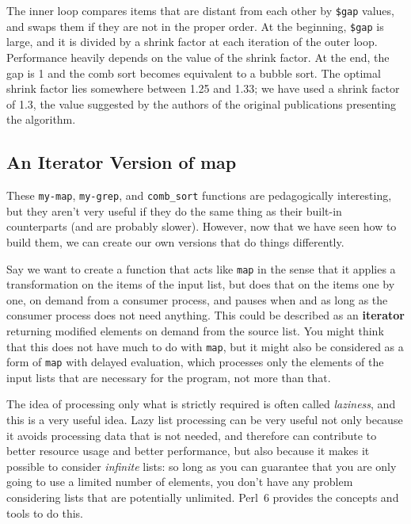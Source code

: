The inner loop compares items that are distant from each 
other by \verb'$gap' values, and swaps them if they are 
not in the proper order. At the beginning, \verb'$gap' 
is large, and it is divided by a shrink factor at each 
iteration of the outer loop. Performance heavily depends
on the value of the shrink factor. At the end, the gap 
is 1 and the comb sort becomes equivalent to a bubble 
sort. The optimal shrink factor lies somewhere between 1.25 
and 1.33; we have used a shrink factor of 1.3, the value 
suggested by the authors of the original publications 
presenting the algorithm.

	\subsection{An Iterator Version of map}

These {\tt my-map}, {\tt my-grep}, and {\tt comb\_sort} 
functions are pedagogically interesting, but they aren't 
very useful if they do the same thing as their built-in 
counterparts (and are probably slower). However, now 
that we have seen how to build them, we can create our 
own versions that do things differently.

Say we want to create a function that acts like 
{\tt map} in the sense that it applies a 
transformation on the items of the input list, but does 
that on the items one by one, on demand from a consumer 
process, and pauses when and as long as the consumer process 
does not need anything. This could be described as an 
{\bf iterator} returning modified elements on demand from the 
source list. You might think that this does not have much to 
do with {\tt map}, but it might also be considered as 
a form of {\tt map} with delayed evaluation, which 
processes only the elements of the input lists that are 
necessary for the program, not more than that. 

The idea 
of processing only what is strictly required is often called 
\emph{laziness}, and this is a very useful idea. Lazy 
list processing can be very useful not only because it 
avoids processing data that is not needed, and therefore 
can contribute to better resource usage and better 
performance, but also because it makes it possible to consider 
\emph{infinite} lists: so long as you can guarantee that 
you are only going to use a limited number of elements, 
you don't have any problem considering lists that are 
potentially unlimited. Perl~6 provides the concepts and 
tools to do this.


